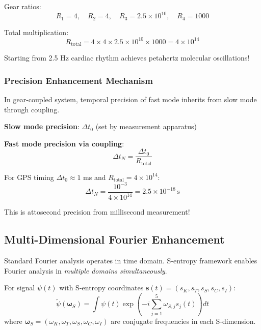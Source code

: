 \documentclass[11pt,onecolumn]{article}
\begin{document}
Gear ratios:
\begin{equation}
R_1 = 4, \quad R_2 = 4, \quad R_3 = 2.5 \times 10^{10}, \quad R_4 = 1000
\end{equation}

Total multiplication:
\begin{equation}
R_{\text{total}} = 4 \times 4 \times 2.5 \times 10^{10} \times 1000 = 4 \times 10^{14}
\end{equation}

Starting from 2.5 Hz cardiac rhythm achieves petahertz molecular oscillations!

\subsubsection{Precision Enhancement Mechanism}

In gear-coupled system, temporal precision of fast mode inherits from slow mode through coupling.

\textbf{Slow mode precision}: $\Delta t_0$ (set by measurement apparatus)

\textbf{Fast mode precision via coupling}:
\begin{equation}
\Delta t_N = \frac{\Delta t_0}{R_{\text{total}}}
\end{equation}

For GPS timing $\Delta t_0 \approx 1$ ms and $R_{\text{total}} = 4 \times 10^{14}$:
\begin{equation}
\Delta t_N = \frac{10^{-3}}{4 \times 10^{14}} = 2.5 \times 10^{-18}\,\text{s}
\end{equation}

This is attosecond precision from millisecond measurement!

\subsection{Multi-Dimensional Fourier Enhancement}

Standard Fourier analysis operates in time domain. S-entropy framework enables Fourier analysis in \textit{multiple domains simultaneously}.

\begin{definition}
For signal $\psi(t)$ with S-entropy coordinates $\mathbf{s}(t) = (s_K, s_T, s_S, s_C, s_I)$:
\begin{equation}
\tilde{\psi}(\boldsymbol{\omega}_S) = \int \psi(t) \exp\left(-i\sum_{j=1}^{5} \omega_{S,j} s_j(t)\right) dt
\end{equation}
where $\boldsymbol{\omega}_S = (\omega_K, \omega_T, \omega_S, \omega_C, \omega_I)$ are conjugate frequencies in each S-dimension.
\end{definition}
\end{document}

